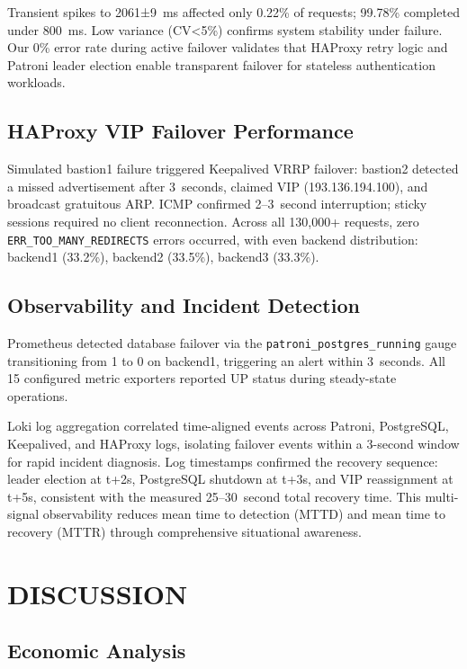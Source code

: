 \documentclass[a4paper,twoside]{article}
\begin{document}
Transient spikes to 2061±9~ms affected only 0.22\% of requests; 99.78\% completed under 800~ms. Low variance (CV\textless5\%) confirms system stability under failure. Our 0\% error rate during active failover validates that HAProxy retry logic and Patroni leader election enable transparent failover for stateless authentication workloads.

\subsection{HAProxy VIP Failover Performance}

Simulated bastion1 failure triggered Keepalived VRRP failover: bastion2 detected a missed advertisement after 3~seconds, claimed VIP (193.136.194.100), and broadcast gratuitous ARP. ICMP confirmed 2--3~second interruption; sticky sessions required no client reconnection. Across all 130,000+ requests, zero \texttt{ERR\_TOO\_MANY\_REDIRECTS} errors occurred, with even backend distribution: backend1 (33.2\%), backend2 (33.5\%), backend3 (33.3\%).

\subsection{Observability and Incident Detection}

Prometheus detected database failover via the \texttt{patroni\_postgres\_running} gauge transitioning from 1 to 0 on backend1, triggering an alert within 3~seconds. All 15 configured metric exporters reported UP status during steady-state operations.

Loki log aggregation correlated time-aligned events across Patroni, PostgreSQL, Keepalived, and HAProxy logs, isolating failover events within a 3-second window for rapid incident diagnosis. Log timestamps confirmed the recovery sequence: leader election at t+2s, PostgreSQL shutdown at t+3s, and VIP reassignment at t+5s, consistent with the measured 25--30~second total recovery time. This multi-signal observability reduces mean time to detection (MTTD) and mean time to recovery (MTTR) through comprehensive situational awareness.

\section{\uppercase{Discussion}}
\label{sec:discussion}

\subsection{Economic Analysis}
\end{document}
